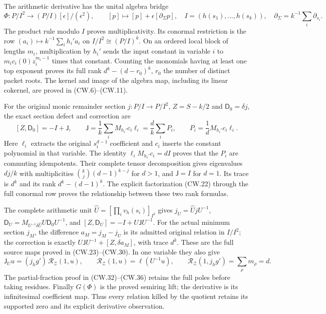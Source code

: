 The arithmetic derivative has the unital algebra bridge
\[
 \Phi:P/I^2\longrightarrow (P/I)[\epsilon]/(\epsilon^2),
 \qquad [p]\longmapsto[p]+\epsilon[\partial_\Sigma p],
 \quad I=(h(s_1),\ldots,h(s_k)),\quad
 \partial_\Sigma=k^{-1}\sum_i\partial_{s_i}.
 \tag{R23}
\]
The product rule modulo \(I\) proves multiplicativity. Its
conormal restriction is the row
\((a_i)\mapsto k^{-1}\sum_i h_i'a_i\) on
\(I/I^2\cong(P/I)^k\). On an ordered local block of lengths
\(m_i\), multiplication by \(h_i'\) sends the input constant
in variable \(i\) to
\(m_ic_i(0)z_i^{m_i-1}\) times that constant. Counting the
monomials having at least one top exponent proves its full rank
\(d^k-(d-r_0)^k\), \(r_0\) the number of distinct packet roots.
The kernel and image of the algebra map, including its
linear cokernel, are proved in (CW.6)--(CW.11).

For the original monic remainder section \(j:P/I\to P/I^2\),
\(Z=S-k/2\) and \(\mathsf D_0=\delta j\), the exact section
defect and correction are
\[
 [Z,\mathsf D_0]=-I+\mathsf J,\qquad
 \mathsf J=\frac1k\sum_i M_{h_i'}c_i\ell_i
          =\frac d k\sum_iP_i,\qquad
 P_i=\frac1dM_{h_i'}c_i\ell_i .
 \tag{R24}
\]
Here \(\ell_i\) extracts the original \(s_i^{d-1}\) coefficient
and \(c_i\) inserts the constant polynomial in that variable.
The identity \(\ell_iM_{h_i'}c_i=dI\) proves that the \(P_i\)
are commuting idempotents. Their complete tensor decomposition
gives eigenvalues \(dj/k\) with multiplicities
\(\binom kj(d-1)^{k-j}\) for \(d>1\), and
\(\mathsf J=I\) for \(d=1\).
Its trace is \(d^k\) and its rank \(d^k-(d-1)^k\).
The explicit factorization (CW.22) through the full conormal row
proves the relationship between these two rank formulas.

The complete arithmetic unit
\(\widehat U=[\prod_i v_h(s_i)]_{I^2}\) gives
\(j_U=\widehat UjU^{-1}\),
\(\mathsf D_U=M_{U^{-1}\delta\widehat U}
U\mathsf D_0U^{-1}\), and
\([Z,\mathsf D_U]=-I+U\mathsf JU^{-1}\).
For the actual minimum section \(j_M\), the difference
\(a_M=j_M-j_U\) is its admitted original relation in \(I/I^2\);
the correction is exactly
\(U\mathsf JU^{-1}+[Z,\delta a_M]\), with trace \(d^k\).
These are the full source maps proved in (CW.23)--(CW.30).
In one variable they also give
\[
 \mathsf J_Uu=(j_hg')\,\mathscr R_{\mathcal Z}(1,u),\qquad
 \mathscr R_{\mathcal Z}(1,u)=\ell(U^{-1}u),\qquad
 \mathscr R_{\mathcal Z}(1,j_hg')=\sum_\rho m_\rho=d .
 \tag{R25}
\]
The partial-fraction proof in (CW.32)--(CW.36) retains the
full poles before taking residues. Finally \(G(\Phi)\) is the
proved semiring lift; the derivative is its infinitesimal
coefficient map. Thus every relation killed by the quotient
retains its supported zero and its explicit derivative observation.

